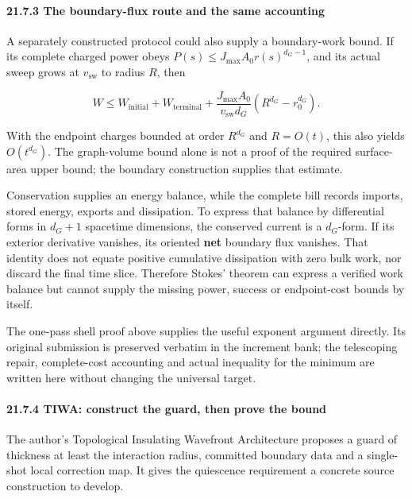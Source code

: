 \documentclass[
]{article}
\begin{document}
\paragraph{21.7.3 The boundary-flux route and the same
accounting}\label{the-boundary-flux-route-and-the-same-accounting}

A separately constructed protocol could also supply a boundary-work
bound. If its complete charged power obeys
\(P(s)\le J_{\max}A_0r(s)^{d_G-1}\), and its actual sweep grows at
\(v_{\mathrm{sw}}\) to radius \(R\), then

\[
W\le W_{\mathrm{initial}}+W_{\mathrm{terminal}}
+\frac{J_{\max}A_0}{v_{\mathrm{sw}}d_G}
(R^{d_G}-r_0^{d_G}).
\]

With the endpoint charges bounded at order \(R^{d_G}\) and \(R=O(t)\),
this also yields \(O(t^{d_G})\). The graph-volume bound alone is not a
proof of the required surface-area upper bound; the boundary
construction supplies that estimate.

Conservation supplies an energy balance, while the complete bill records
imports, stored energy, exports and dissipation. To express that balance
by differential forms in \(d_G+1\) spacetime dimensions, the conserved
current is a \(d_G\)-form. If its exterior derivative vanishes, its
oriented \textbf{net} boundary flux vanishes. That identity does not
equate positive cumulative dissipation with zero bulk work, nor discard
the final time slice. Therefore Stokes' theorem can express a verified
work balance but cannot supply the missing power, success or
endpoint-cost bounds by itself.

The one-pass shell proof above supplies the useful exponent argument
directly. Its original submission is preserved verbatim in the increment
bank; the telescoping repair, complete-cost accounting and actual
inequality for the minimum are written here without changing the
universal target.

\paragraph{21.7.4 TIWA: construct the guard, then prove the
bound}\label{tiwa-construct-the-guard-then-prove-the-bound}

The author's Topological Insulating Wavefront Architecture proposes a
guard of thickness at least the interaction radius, committed boundary
data and a single-shot local correction map. It gives the quiescence
requirement a concrete source construction to develop.
\end{document}
